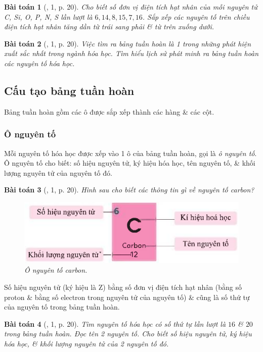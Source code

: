 \documentclass{article}
\newtheorem{baitoan}{Bài toán}
\begin{document}
\begin{baitoan}[\cite{SGK_KHTN_7_Canh_Dieu}, 1, p. 20]
	Cho biết số đơn vị điện tích hạt nhân của mỗi nguyên tử \emph{C, Si, O, P, N, S} lần lượt là $6,14,8,15,7,16$. Sắp xếp các nguyên tố trên chiều điện tích hạt nhân tăng dần từ trái sang phải \& từ trên xuống dưới.
\end{baitoan}

\begin{baitoan}[\cite{SGK_KHTN_7_Canh_Dieu}, 1, p. 20]
	Việc tìm ra bảng tuần hoàn là 1 trong những phát hiện xuất sắc nhất trong ngành hóa học. Tìm hiểu lịch sử phát minh ra bảng tuần hoàn các nguyên tố hóa học.
\end{baitoan}

\subsection{Cấu tạo bảng tuần hoàn}
Bảng tuần hoàn gồm các ô được sắp xếp thành các hàng \& các cột.

\subsubsection{Ô nguyên tố}
Mỗi nguyên tố hóa học được xếp vào 1 ô của bảng tuần hoàn, gọi là \textit{ô nguyên tố}. Ô nguyên tố cho biết: số hiệu nguyên tử, ký hiệu hóa học, tên nguyên tố, \& khối lượng nguyên tử của nguyên tố đó.

\begin{baitoan}[\cite{SGK_KHTN_7_Canh_Dieu}, 1, p. 20]
	Hình sau cho biết các thông tin gì về nguyên tố carbon?
	\begin{figure}[H]
		\centering
		\includegraphics[scale=0.3]{carbon_element}
		\caption{Ô nguyên tố carbon.}
	\end{figure}
\end{baitoan}
Số hiệu nguyên tử (ký hiệu là Z) bằng số đơn vị điện tích hạt nhân (bằng số proton \& bằng số electron trong nguyên tử của nguyên tố) \& cũng là số thứ tự của nguyên tố trong bảng tuần hoàn.

\begin{baitoan}[\cite{SGK_KHTN_7_Canh_Dieu}, 1, p. 20]
	Tìm nguyên tố hóa học có số thứ tự lần lượt là $16$ \& $20$ trong bảng tuần hoàn. Đọc tên 2 nguyên tố. Cho biết số hiệu nguyên tử, ký hiệu hóa học, \& khối lượng nguyên tử của 2 nguyên tố đó.
\end{baitoan}
\end{document}
